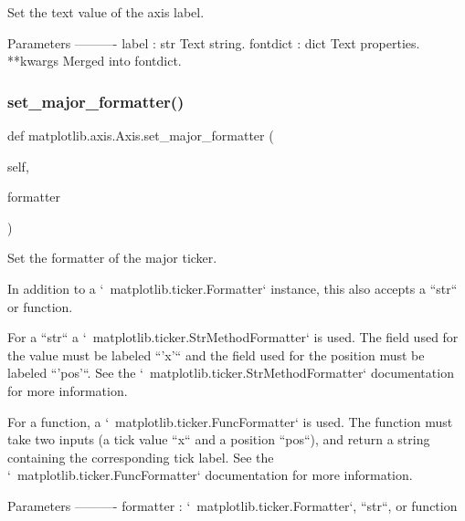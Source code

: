 \begin{DoxyVerb}Set the text value of the axis label.

Parameters
----------
label : str
    Text string.
fontdict : dict
    Text properties.
**kwargs
    Merged into fontdict.
\end{DoxyVerb}
 \mbox{\label{classmatplotlib_1_1axis_1_1Axis_a0f6fad84ea6b470d82c7bb851a838f87}} 
\subsubsection{\texorpdfstring{set\+\_\+major\+\_\+formatter()}{set\_major\_formatter()}}
{\footnotesize\ttfamily def matplotlib.\+axis.\+Axis.\+set\+\_\+major\+\_\+formatter (\begin{DoxyParamCaption}\item[{}]{self,  }\item[{}]{formatter }\end{DoxyParamCaption})}

\begin{DoxyVerb}Set the formatter of the major ticker.

In addition to a `~matplotlib.ticker.Formatter` instance,
this also accepts a ``str`` or function.

For a ``str`` a `~matplotlib.ticker.StrMethodFormatter` is used.
The field used for the value must be labeled ``'x'`` and the field used
for the position must be labeled ``'pos'``.
See the  `~matplotlib.ticker.StrMethodFormatter` documentation for
more information.

For a function, a `~matplotlib.ticker.FuncFormatter` is used.
The function must take two inputs (a tick value ``x`` and a
position ``pos``), and return a string containing the corresponding
tick label.
See the  `~matplotlib.ticker.FuncFormatter` documentation for
more information.

Parameters
----------
formatter : `~matplotlib.ticker.Formatter`, ``str``, or function
\end{DoxyVerb}
 \mbox{\label{classmatplotlib_1_1axis_1_1Axis_a1e8703fe33a365026e550df622f59552}} 
